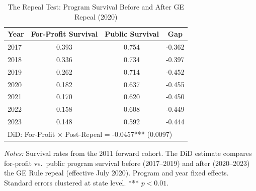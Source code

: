 \begin{table}[H]
\centering
\caption{The Repeal Test: Program Survival Before and After GE Repeal (2020)}
\label{tab:repeal}
\begin{threeparttable}
\begin{tabular}{lccc}
\toprule
Year & For-Profit Survival & Public Survival & Gap \\
\midrule
2017 & 0.393 & 0.754 & -0.362 \\
2018 & 0.336 & 0.734 & -0.397 \\
2019 & 0.262 & 0.714 & -0.452 \\
2020 & 0.182 & 0.637 & -0.455 \\
2021 & 0.170 & 0.620 & -0.450 \\
2022 & 0.158 & 0.608 & -0.449 \\
2023 & 0.148 & 0.592 & -0.444 \\
\midrule
\multicolumn{4}{l}{DiD: For-Profit $\times$ Post-Repeal = -0.0457*** (0.0097)} \\
\bottomrule
\end{tabular}
\begin{tablenotes}[flushleft]
\small
\item \textit{Notes:} Survival rates from the 2011 forward cohort. The DiD estimate compares for-profit vs.\ public program survival before (2017--2019) and after (2020--2023) the GE Rule repeal (effective July 2020). Program and year fixed effects. Standard errors clustered at state level. *** $p<0.01$.
\end{tablenotes}
\end{threeparttable}
\end{table}
